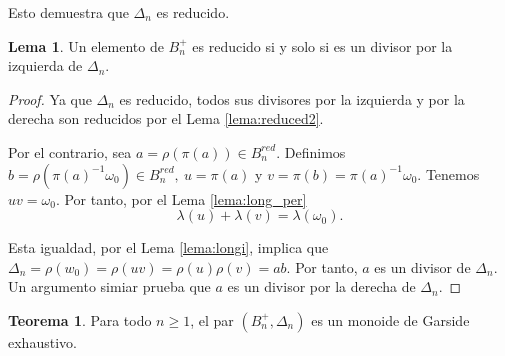 \documentclass[12pt]{book}
\theoremstyle{definition}
\newtheorem{teor}{Teorema}[section]
\newtheorem{lema}{Lema}[section]
\begin{document}
Esto demuestra que $\Delta_n$ es reducido.

\begin{lema}
Un elemento de $B_n^+$ es reducido si y solo si es un divisor por la izquierda de $\Delta_n$.
\label{lema:reduced3}
\end{lema}

\begin{proof} Ya que $\Delta_n$ es reducido, todos sus divisores por la izquierda y por la derecha son reducidos por el Lema \ref{lema:reduced2}.

Por el contrario, sea $a=\rho(\pi(a))\in B_n^{red}$. Definimos $b=\rho(\pi(a)^{-1}\omega_0)\in B_n^{red},\ u=\pi(a)$ y $v=\pi(b)=\pi(a)^{-1}\omega_0$. Tenemos $uv=\omega_0$. Por tanto, por el Lema \ref{lema:long_per} 
$$\lambda(u)+\lambda(v)=\lambda(\omega_0).$$

Esta igualdad, por el Lema \ref{lema:longi}, implica que $\Delta_n=\rho(w_0)=\rho(uv)=\rho(u)\rho(v)=ab$. Por tanto, $a$ es un divisor de $\Delta_n$. Un argumento simiar prueba que $a$ es un divisor por la derecha de $\Delta_n$.
\end{proof}

\begin{teor}
Para todo $n\geq 1$, el par $(B_n^+,\Delta_n)$ es un monoide de Garside exhaustivo.
\label{teor:trenzas-garside}
\end{teor}
\end{document}
